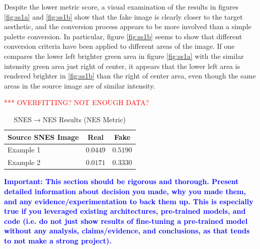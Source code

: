 \documentclass[10pt,twocolumn,letterpaper]{article}
\begin{document}
Despite the lower metric score, a visual examination of the results in figures \ref{fig:ss1a} and \ref{fig:ss1b} show that the fake image is clearly closer to the target aesthetic, and the conversion process appears to be more involved than a simple palette conversion.
In particular, figure \ref{fig:ss1b} seems to show that different conversion criteria have been applied to different areas of the image. If one compares the lower left brighter green area in figure \ref{fig:ss1a} with the similar intensity green area just right of center, it appears that the lower left area is rendered brighter in \ref{fig:ss1b} than the right of center area, even though the same areas in the source image are of similar intensity.

\textcolor{red}{*** OVERFITTING? NOT ENOUGH DATA?}

\begin{table}
   \begin{center}
      \begin{tabular}{|l|c|c|}
         \hline
         Source SNES Image & Real  & Fake           \\
         \hline\hline
         Example 1 & $0.0449$  & $0.5190$           \\
         Example 2  & $0.0171$ & $0.3330$           \\
         \hline
      \end{tabular}
   \end{center}
   \caption{SNES$\rightarrow$NES Results (NES Metric)}
   \label{tab:nesresults}
\end{table}
       

\textbf{\textcolor{blue}{Important: This section should be rigorous and thorough. Present detailed information about decision you made, why you made them, and any evidence/experimentation to back them up. This is especially true if you leveraged existing architectures, pre-trained models, and code (i.e. do not just show results of fine-tuning a pre-trained model without any analysis, claims/evidence, and conclusions, as that tends to not make a strong project). }}
\end{document}
